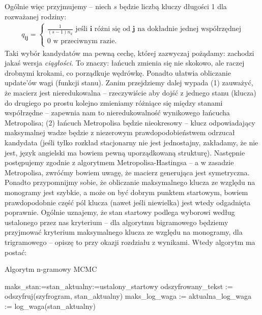 \documentclass[a4paper]{article}
\theoremstyle{defn}
\theoremstyle{theorem}
\theoremstyle{lemma}
\theoremstyle{cor}
\theoremstyle{fact}
\begin{document}
Ogólnie więc przyjmujemy – niech $s$ będzie liczbą kluczy długości 1 dla rozważanej rodziny:\\
\begin{align*}
q_{\boldsymbol{ij}} = \begin{cases}
  \frac{1}{(s-1)n_k} \,\, \text{jeśli $\boldsymbol{i}$ różni się od $\boldsymbol{j}$ na dokładnie jednej współrzędnej} \\
  0 \,\, \text{w przeciwnym razie.}
\end{cases}
\end{align*}
Taki wybór kandydatów ma pewną cechę, której zazwyczaj pożądamy: zachodzi jakaś wersja \textit{ciągłości}. To znaczy: łańcuch zmienia się nie skokowo, ale raczej drobnymi krokami, co porządkuje wędrówkę. Ponadto ułatwia obliczanie update'ów wagi (funkcji stanu).
Zanim przejdziemy dalej wypada (1) zauważyć, że macierz jest nieredukowalna – rzeczywiście aby dojść z jednego stanu (klucza) do drugiego po prostu kolejno zmieniamy różniące się między stanami współrzędne – zapewnia nam to nieredukowalność wynikowego łańcucha Metropolisa; (2) łańcuch Metropolisa będzie nieokresowy – klucz odpowiadający maksymalnej wadze będzie z niezerowym prawdopodobieństwem odrzucał kandydata (jeśli tylko rozkład stacjonarny nie jest jednostajny, zakładamy, że nie jest, język angielski ma bowiem pewną uporządkowaną strukturę).
Następnie postępujemy zgodnie z algorytmem Metropolisa-Hastingsa – a w zasadzie Metropolisa, zwróćmy bowiem uwagę, że macierz generująca jest symetryczna. Ponadto przypomnijmy sobie, że obliczanie maksymalnego klucza ze względu na monogramy jest szybkie, a może on być dobrym punktem startowym, bowiem prawdopodobnie część pól klucza (nawet jeśli niewielka) jest wtedy odgadnięta poprawnie. Ogólnie uznajemy, że stan startowy podlega wyborowi według ustalonego przez nas kryterium – dla algorytmu bigramowego będziemy przyjmować kryterium maksymalnego klucza ze względu na monogramy, dla trigramowego – opiszę to przy okazji rozdziału z wynikami. Wtedy algorytm ma postać:\\
\begin{algorithm}[H]
\caption{Algorytm n-gramowy MCMC}
maks\_stan:=stan\_aktualny:=ustalony\_startowy\;
odszyfrowany\_tekst := odszyfruj(szyfrogram, stan\_aktualny)\;
maks\_log\_waga := aktualna\_log\_waga := log\_waga(stan\_aktualny)\;
\end{algorithm}
\end{document}
